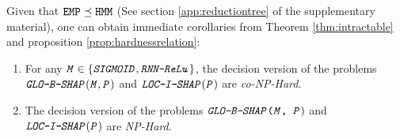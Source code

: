 Given that $\texttt{\text{EMP}} \preceq \texttt{\text{HMM}}$ (See section \ref{app:reductiontree} of the supplementary material), one can obtain immediate corollaries from Theorem \ref{thm:intractable} and proposition \ref{prop:hardnessrelation}:
\begin{corollary} \label{cor:globshaphard}
    \begin{enumerate}
        Let $\texttt{\emph{P}} \in \{ \texttt{\emph{EMP}}, \texttt{\emph{HMM}}\}$.
        \item For any $\texttt{\emph{M}} \in \{\texttt{\emph{SIGMOID}}, \texttt{\emph{RNN-ReLu}} \}$, the decision version of the problems $\texttt{\emph{GLO-B-SHAP}}(\texttt{\emph{M}}, \texttt{\emph{P}})$ and $\texttt{\emph{LOC-I-SHAP}}(\texttt{\emph{P}})$ are \emph{co-NP-Hard}.
        \item The decision version of the problems  $\texttt{\emph{GLO-B-SHAP}(\texttt{\emph{M}}, \texttt{\emph{P}}})$ and $\texttt{\emph{LOC-I-SHAP}}(\texttt{\emph{P}})$ are \emph{NP-Hard}. 
    \end{enumerate} 
\end{corollary}


